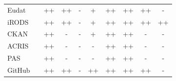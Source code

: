 \begin{table}
{\begin{tabular}{| l | c |c | c | c | c | c | c | c | c |}
            \cline{3-10}\cline{1-1}
            \cellcolor{first-column-blue}Eudat       && \cellcolor{green}++ & \cellcolor{green}++ & \cellcolor{red}- & \cellcolor{yellow}+  & \cellcolor{green}++  &  \cellcolor{green}++ & \cellcolor{green}++  & \cellcolor{red}- \\
            \cline{3-10}\cline{1-1}
            \cellcolor{first-column-blue}iRODS       && \cellcolor{green}++ & \cellcolor{green}++ & \cellcolor{red}-  & \cellcolor{yellow}+  & \cellcolor{green}++  &  \cellcolor{green}++ & \cellcolor{green}++  & \cellcolor{green}++ \\
            \cline{3-10}\cline{1-1}
            \cellcolor{first-column-blue}CKAN        && \cellcolor{green}++ & \cellcolor{red}- & \cellcolor{red}- & \cellcolor{yellow}+ & \cellcolor{green}++  &  \cellcolor{green}++ & \cellcolor{red}-  & \cellcolor{red}- \\
            \cline{3-10}\cline{1-1}
            \cellcolor{first-column-blue}ACRIS       && \cellcolor{green}++  & \cellcolor{red}-  & \cellcolor{red}-  & \cellcolor{red}-  & \cellcolor{green}++  &  \cellcolor{green}++ & \cellcolor{red}-  & \cellcolor{red}- \\
            \cline{3-10}\cline{1-1}
            \cellcolor{first-column-blue}PAS         && \cellcolor{green}++ & \cellcolor{red}- & \cellcolor{red}- & \cellcolor{red}-  & \cellcolor{green}++ &  \cellcolor{green}++ & \cellcolor{red}-  & \cellcolor{red}- \\
            \cline{3-10}\cline{1-1}
            \cellcolor{first-column-blue}GitHub      && \cellcolor{green}++ & \cellcolor{green}++  & \cellcolor{red}- & \cellcolor{green}++ & \cellcolor{green}++  &  \cellcolor{green}++ & \cellcolor{green}++ & \cellcolor{red}- \\
            \cline{3-10}\cline{1-1}
        \end{tabular}
    }
\end{table}

